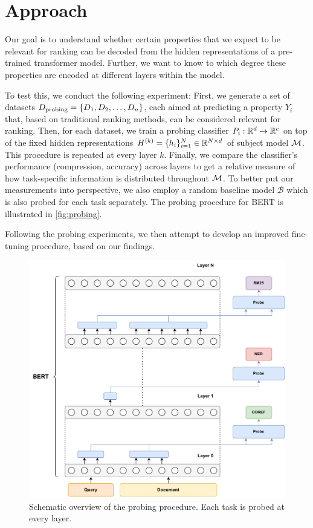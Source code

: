 \chapter{Approach}
\label{chap:approach}
Our goal is to understand whether certain properties that we expect to be relevant for ranking can be decoded from the hidden representations of a pre-trained transformer model. Further, we want to know to which degree these properties are encoded at different layers within the model.

To test this, we conduct the following experiment: First, we generate a set of datasets $D_{\text{probing}}=\{D_1, D_2, \dots, D_n \}$, each aimed at predicting a property $Y_i$ that, based on traditional ranking methods, can be considered relevant for ranking. Then, for each dataset, we train a probing classifier $P_i: \mathbb{R}^d \rightarrow \mathbb{R}^c$ on top of the fixed hidden representations $H^{(k)} = \{h_i\}_{i=1}^N \in \mathbb{R}^{N \times d}$ of subject model $\mathcal{M}$. This procedure is repeated at every layer $k$. Finally, we compare the classifier's performance (compression, accuracy) across layers to get a relative measure of how task-specific information is distributed throughout $\mathcal{M}$. To better put our measurements into perspective, we also employ a random baseline model $\mathcal{B}$ which is also probed for each task separately. The probing procedure for BERT is illustrated in \autoref{fig:probing}.

Following the probing experiments, we then attempt to develop an improved fine-tuning procedure, based on our findings.

\begin{figure}[!ht]
    \centering
    \includegraphics[width=\textwidth]{gfx/probing/probing}
    \caption{Schematic overview of the probing procedure. Each task is probed at every layer.}
    \label{fig:probing}
\end{figure}

